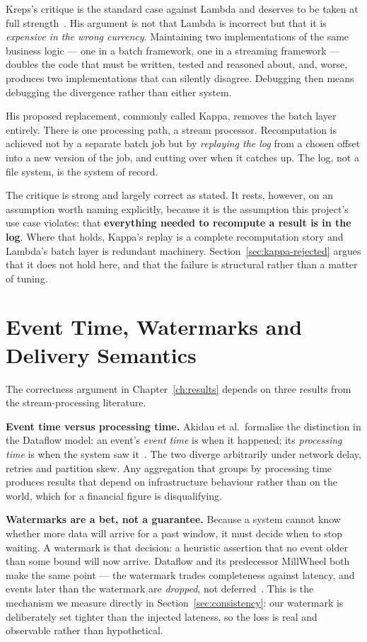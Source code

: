 Kreps's critique is the standard case against
Lambda and deserves to be taken at full strength~\cite{kreps2014questioning}.
His argument is not that Lambda is incorrect but that it is
\emph{expensive in the wrong currency}. Maintaining two implementations
of the same business logic --- one in a batch framework, one in a
streaming framework --- doubles the code that must be written, tested and
reasoned about, and, worse, produces two implementations that can
silently disagree. Debugging then means debugging the divergence rather
than either system.

His proposed replacement, commonly called Kappa, removes the batch layer
entirely. There is one processing path, a stream processor. Recomputation
is achieved not by a separate batch job but by \emph{replaying the log}
from a chosen offset into a new version of the job, and cutting over when
it catches up. The log, not a file system, is the system of record.

The critique is strong and largely correct as stated. It rests, however,
on an assumption worth naming explicitly, because it is the assumption
this project's use case violates: that \textbf{everything needed to
recompute a result is in the log}. Where that holds, Kappa's replay is a
complete recomputation story and Lambda's batch layer is redundant
machinery. Section~\ref{sec:kappa-rejected} argues that it does not hold
here, and that the failure is structural rather than a matter of tuning.

\section{Event Time, Watermarks and Delivery Semantics}
\label{sec:lit-semantics}

The correctness argument in Chapter~\ref{ch:results} depends on three
results from the stream-processing literature.

\textbf{Event time versus processing time.} Akidau et al.\ formalise the
distinction in the Dataflow model: an event's \emph{event time} is when
it happened; its \emph{processing time} is when the system saw
it~\cite{akidau2015dataflow}. The two diverge arbitrarily under network
delay, retries and partition skew. Any aggregation that groups by
processing time produces results that depend on infrastructure
behaviour rather than on the world, which for a financial figure is
disqualifying.

\textbf{Watermarks are a bet, not a guarantee.} Because a system cannot
know whether more data will arrive for a past window, it must decide when
to stop waiting. A watermark is that decision: a heuristic assertion that
no event older than some bound will now arrive. Dataflow and its
predecessor MillWheel both make the same point --- the watermark trades
completeness against latency, and events later than the watermark are
\emph{dropped}, not deferred~\cite{akidau2015dataflow,akidau2013millwheel}.
This is the mechanism we measure directly in
Section~\ref{sec:consistency}: our watermark is deliberately set tighter
than the injected lateness, so the loss is real and observable rather
than hypothetical.

